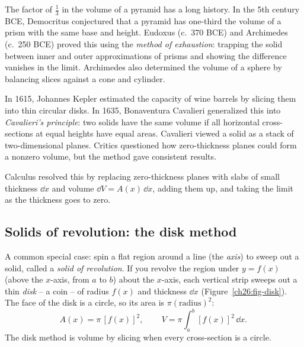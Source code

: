 \begin{historybox}
The factor of $\tfrac13$ in the volume of a pyramid has a long history. In the 5th
century BCE, Democritus conjectured that a pyramid has one-third the volume of a
prism with the same base and height. Eudoxus (c.~370 BCE) and Archimedes (c.~250 BCE)
proved this using the \emph{method of exhaustion}: trapping the solid between inner
and outer approximations of prisms and showing the difference vanishes in the limit.
Archimedes also determined the volume of a sphere by balancing slices against a cone
and cylinder.

In 1615, Johannes Kepler estimated the capacity of wine barrels by slicing them into
thin circular disks. In 1635, Bonaventura Cavalieri generalized this into
\emph{Cavalieri's principle}: two solids have the same volume if all horizontal
cross-sections at equal heights have equal areas. Cavalieri viewed a solid as a stack
of two-dimensional planes. Critics questioned how zero-thickness planes could form a
nonzero volume, but the method gave consistent results.

Calculus resolved this by replacing zero-thickness planes with slabs of small
thickness $\dd x$ and volume $\dd V = A(x)\,\dd x$, adding them up, and taking the
limit as the thickness goes to zero.
\end{historybox}

\subsection{Solids of revolution: the disk method}

A common special case: spin a flat region around a line (the \emph{axis}) to sweep
out a solid, called a \emph{solid of revolution}. If you revolve the region under
$y=f(x)$ (above the $x$-axis, from $a$ to $b$) about the $x$-axis, each vertical
strip sweeps out a thin \emph{disk} -- a coin -- of radius $f(x)$ and thickness
$\dd x$ (Figure~\ref{ch26:fig-disk}). The face of the disk is a circle, so its
area is $\pi(\text{radius})^2$:
\[
  A(x) = \pi\,[f(x)]^2, \qquad
  \boxed{\,V = \pi\int_a^b [f(x)]^2\,\dd x.\,}
\]
The disk method is volume by slicing when every cross-section is a circle.

